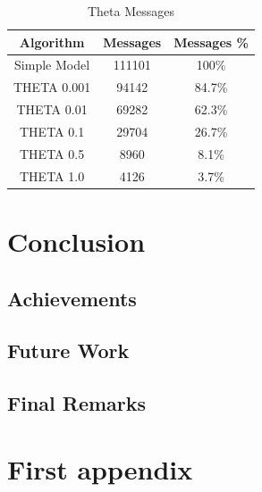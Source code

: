 \documentclass{mproj}
\begin{document}
 \begin{table}[!ht]
 \centering
 \begin{tabular}{||c | c | c||}
 \hline
 Algorithm & Messages & Messages \%\\
 \hline\hline
 Simple Model & 111101 & 100\%\\ 
 \hline
 THETA 0.001 & 94142 & 84.7\%\\
 \hline
 THETA 0.01 & 69282 & 62.3\%\\
 \hline
 THETA 0.1 & 29704 & 26.7\%\\
 \hline
 THETA 0.5 & 8960 & 8.1\%\\
 \hline
 THETA 1.0 & 4126 & 3.7\%\\
 \hline
\end{tabular}
\caption{Theta Messages}
 \label{table:thetaMessages} 
\end{table}


\chapter{Conclusion}
\label{conclusion}

\section{Achievements}

\section{Future Work}

\section{Final Remarks}

\appendix %

\chapter{First appendix}



\end{document}
